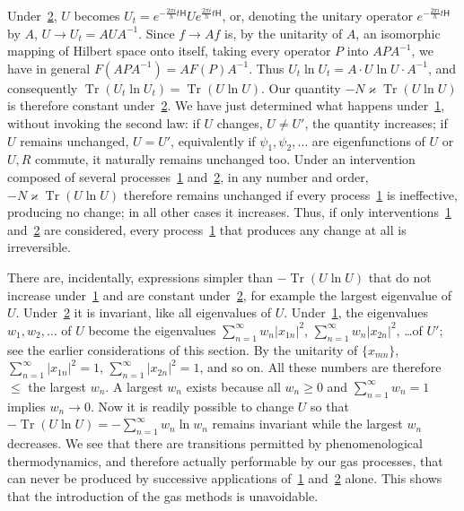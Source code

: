 \documentclass[fontsize=13pt,twoside,openany,headings=normal,parskip=false,bookmarkpackage=false,DIV=calc]{scrbook}
\begin{document}
Under~\hyperref[eq:V.1.2]{2}, $U$ becomes $U_t=e^{-\frac{2\pi i}{h}t\mathsf{H}}Ue^{\frac{2\pi i}{h}t\mathsf{H}}$, or, denoting the unitary operator $e^{-\frac{2\pi i}{h}t\mathsf{H}}$ by $A$, $U\to U_t=AUA^{-1}$. Since $f\to Af$ is, by the unitarity of $A$, an isomorphic mapping of Hilbert space onto itself, taking every operator $P$ into $APA^{-1}$, we have in general $F(APA^{-1})=AF(P)A^{-1}$. Thus $U_t\ln U_t=A\cdot U\ln U\cdot A^{-1}$, and consequently $\operatorname{Tr}(U_t\ln U_t)=\operatorname{Tr}(U\ln U)$. Our quantity $-N\varkappa\operatorname{Tr}(U\ln U)$ is therefore constant under~\hyperref[eq:V.1.2]{2}. We have just determined what happens under~\hyperref[eq:V.1.1]{1}, without invoking the second law: if $U$ changes, $U\ne U'$, the quantity increases; if $U$ remains unchanged, $U=U'$, equivalently if $\psi_1,\psi_2,\ldots$ are eigenfunctions of $U$ or $U,R$ commute, it naturally remains unchanged too. Under an intervention composed of several processes~\hyperref[eq:V.1.1]{1} and~\hyperref[eq:V.1.2]{2}, in any number and order, $-N\varkappa\operatorname{Tr}(U\ln U)$ therefore remains unchanged if every process~\hyperref[eq:V.1.1]{1} is ineffective, producing no change; in all other cases it increases.
\hypertarget{origpage-207}{}%
Thus, if only interventions~\hyperref[eq:V.1.1]{1} and~\hyperref[eq:V.1.2]{2} are considered, every process~\hyperref[eq:V.1.1]{1} that produces any change at all is irreversible.

There are, incidentally, expressions simpler than $-\operatorname{Tr}(U\ln U)$ that do not increase under~\hyperref[eq:V.1.1]{1} and are constant under~\hyperref[eq:V.1.2]{2}, for example the largest eigenvalue of $U$. Under~\hyperref[eq:V.1.2]{2} it is invariant, like all eigenvalues of $U$. Under~\hyperref[eq:V.1.1]{1}, the eigenvalues $w_1,w_2,\ldots$ of $U$ become the eigenvalues $\sum_{n=1}^{\infty}w_n|x_{1n}|^2$, $\sum_{n=1}^{\infty}w_n|x_{2n}|^2$, \ldots of $U'$; see the earlier considerations of this section. By the unitarity of $\{x_{mn}\}$, $\sum_{n=1}^{\infty}|x_{1n}|^2=1$, $\sum_{n=1}^{\infty}|x_{2n}|^2=1$, and so on. All these numbers are therefore $\leq$ the largest $w_n$. A largest $w_n$ exists because all $w_n\geq0$ and $\sum_{n=1}^{\infty}w_n=1$ implies $w_n\to0$. Now it is readily possible to change $U$ so that $-\operatorname{Tr}(U\ln U)=-\sum_{n=1}^{\infty}w_n\ln w_n$ remains invariant while the largest $w_n$ decreases. We see that there are transitions permitted by phenomenological thermodynamics, and therefore actually performable by our gas processes, that can never be produced by successive applications of~\hyperref[eq:V.1.1]{1} and~\hyperref[eq:V.1.2]{2} alone. This shows that the introduction of the gas methods is unavoidable.
\end{document}
